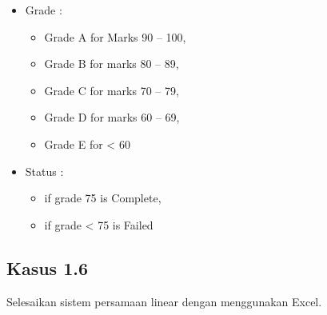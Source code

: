 \documentclass[
]{book}
\providecommand{\tightlist}{%
  \setlength{\itemsep}{0pt}\setlength{\parskip}{0pt}}
\begin{document}
\begin{itemize}
\item
  Grade :

  \begin{itemize}
  \tightlist
  \item
    Grade A for Marks 90 -- 100,
  \item
    Grade B for marks 80 -- 89,
  \item
    Grade C for marks 70 -- 79,
  \item
    Grade D for marks 60 -- 69,
  \item
    Grade E for \textless{} 60
  \end{itemize}
\item
  Status :

  \begin{itemize}
  \tightlist
  \item
    if grade 75 is Complete,
  \item
    if grade \textless{} 75 is Failed
  \end{itemize}
\end{itemize}

\hypertarget{kasus-1.6}{%
\subsection*{Kasus 1.6}\label{kasus-1.6}}

Selesaikan sistem persamaan linear dengan menggunakan Excel.

  
\end{document}
